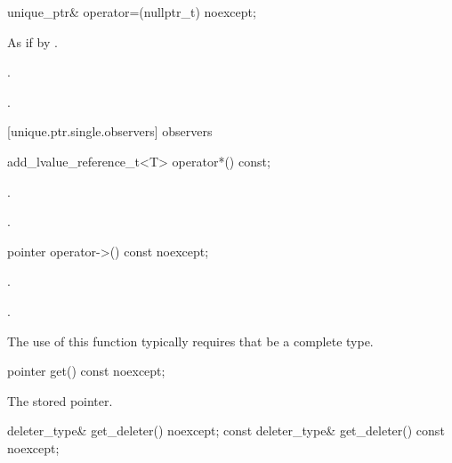 %
\begin{itemdecl}
unique_ptr& operator=(nullptr_t) noexcept;
\end{itemdecl}

\begin{itemdescr}
\pnum
\effects As if by .

\pnum
\postconditions {}.

\pnum
\returns {}.
\end{itemdescr}

[unique.ptr.single.observers]{ observers}

%
\begin{itemdecl}
add_lvalue_reference_t<T> operator*() const;
\end{itemdecl}

\begin{itemdescr}
\pnum
\requires {}.

\pnum
\returns {}.

\end{itemdescr}

%
\begin{itemdecl}
pointer operator->() const noexcept;
\end{itemdecl}

\begin{itemdescr}
\pnum
\requires {}.

\pnum
\returns {}.

\pnum
\begin{note}
The use of this function typically requires that  be a complete type.
\end{note}
\end{itemdescr}

%
\begin{itemdecl}
pointer get() const noexcept;
\end{itemdecl}

\begin{itemdescr}
\pnum
\returns The stored pointer.
\end{itemdescr}

%
\begin{itemdecl}
deleter_type& get_deleter() noexcept;
const deleter_type& get_deleter() const noexcept;
\end{itemdecl}

